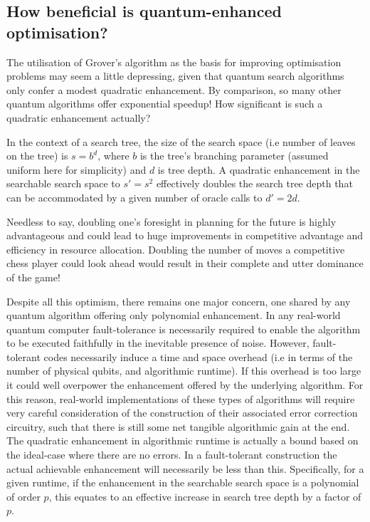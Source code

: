

\subsection{How beneficial is quantum-enhanced optimisation?}

The utilisation of Grover's algorithm as the basis for improving optimisation problems may seem a little depressing, given that quantum search algorithms only confer a modest quadratic enhancement. By comparison, so many other quantum algorithms offer exponential speedup! How significant is such a quadratic enhancement actually?

In the context of a search tree, the size of the search space (i.e number of leaves on the tree) is \mbox{$s=b^d$},
where $b$ is the tree's branching parameter (assumed uniform here for simplicity) and $d$ is tree depth. A quadratic enhancement in the searchable search space to \mbox{$s'=s^2$} effectively doubles the search tree depth that can be accommodated by a given number of oracle calls to \mbox{$d'=2d$}.

Needless to say, doubling one's foresight in planning for the future is highly advantageous and could lead to huge improvements in competitive advantage and efficiency in resource allocation. Doubling the number of moves a competitive chess player could look ahead would result in their complete and utter dominance of the game!

Despite all this optimism, there remains one major concern, one shared by any quantum algorithm offering only polynomial enhancement. In any real-world quantum computer fault-tolerance is necessarily required to enable the algorithm to be executed faithfully in the inevitable presence of noise. However, fault-tolerant codes necessarily induce a time and space overhead (i.e in terms of the number of physical qubits, and algorithmic runtime). If this overhead is too large it could well overpower the   enhancement offered by the underlying algorithm. For this reason, real-world implementations of these types of algorithms will require very careful consideration of the construction of their associated error correction circuitry, such that there is still some net tangible algorithmic gain at the end. The quadratic enhancement in algorithmic runtime is actually a bound based on the ideal-case where there are no errors. In a fault-tolerant construction the actual achievable enhancement will necessarily be less than this. Specifically, for a given runtime, if the enhancement in the searchable search space is a polynomial of order $p$, this equates to an effective increase in search tree depth by a factor of $p$.

